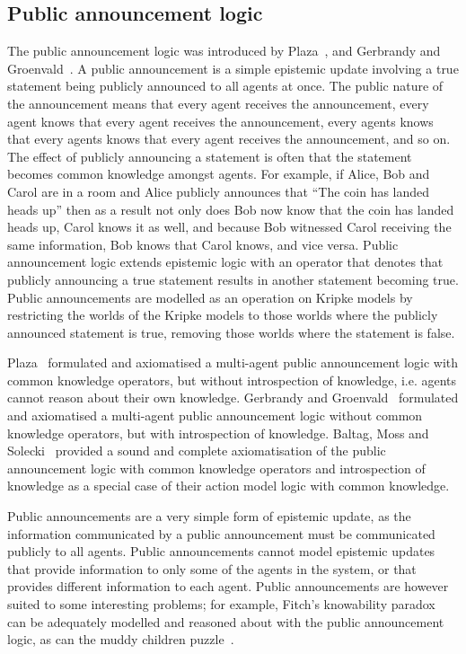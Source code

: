 \subsection{Public announcement logic}

The public announcement logic was introduced by Plaza~\cite{plaza:1989}, and Gerbrandy and Groenvald~\cite{gerbrandy:1997}.
A public announcement is a simple epistemic update involving a true statement being publicly announced to all agents at once.
The public nature of the announcement means that every agent receives the announcement, every agent knows that every agent receives the announcement, every agents knows that every agents knows that every agent receives the announcement, and so on. 
The effect of publicly announcing a statement is often that the statement becomes common knowledge amongst agents. 
For example, if Alice, Bob and Carol are in a room and Alice publicly announces that ``The coin has landed heads up'' then as a result not only does Bob now know that the coin has landed heads up, Carol knows it as well, and because Bob witnessed Carol receiving the same information, Bob knows that Carol knows, and vice versa.
Public announcement logic extends epistemic logic with an operator that denotes that publicly announcing a true statement results in another statement becoming true.
Public announcements are modelled as an operation on Kripke models by restricting the worlds of the Kripke models to those worlds where the publicly announced statement is true, removing those worlds where the statement is false.

Plaza~\cite{plaza:1989} formulated and axiomatised a multi-agent public announcement logic with common knowledge operators, but without introspection of knowledge, i.e.  agents cannot reason about their own knowledge. 
Gerbrandy and Groenvald~\cite{gerbrandy:1997} formulated and axiomatised a multi-agent public announcement logic without common knowledge operators, but with introspection of knowledge.
Baltag, Moss and Solecki~\cite{baltag:1998,baltag:2004} provided a sound and complete axiomatisation of the public announcement logic with common knowledge operators and introspection of knowledge as a special case of their action model logic with common knowledge.

Public announcements are a very simple form of epistemic update, as the information communicated by a public announcement must be communicated publicly to all agents.
Public announcements cannot model epistemic updates that provide information to only some of the agents in the system, or that provides different information to each agent.
Public announcements are however suited to some interesting problems; for example, Fitch's knowability paradox~\cite{fitch:1963} can be adequately modelled and reasoned about with the public announcement logic, as can the muddy children puzzle~\cite{barwise:1981, vanditmarsch:2007}.

